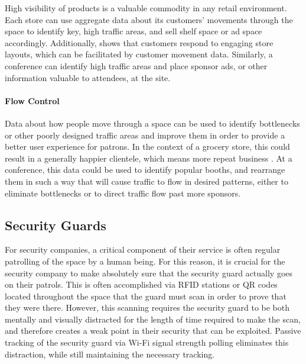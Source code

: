 High visibility of products is a valuable commodity in any retail environment. Each store can use aggregate data about its customers' movements through the space to identify key, high traffic areas, and sell shelf space or ad space accordingly. Additionally, \cite{shukla2013effects} shows that customers respond to engaging store layouts, which can be facilitated by customer movement data. Similarly, a conference can identify high traffic areas and place sponsor ads, or other information valuable to attendees, at the site.

\paragraph{Flow Control}

Data about how people move through a space can be used to identify bottlenecks or other poorly designed traffic areas and improve them in order to provide a better user experience for patrons. In the context of a grocery store, this could result in a generally happier clientele, which means more repeat business \cite{shukla2013effects}. At a conference, this data could be used to identify popular booths, and rearrange them in such a way that will cause traffic to flow in desired patterns, either to eliminate bottlenecks or to direct traffic flow past more sponsors.

\subsection{Security Guards}

For security companies, a critical component of their service is often regular patrolling of the space by a human being. For this reason, it is crucial for the security company to make absolutely sure that the security guard actually goes on their patrols. This is often accomplished via RFID stations or QR codes located throughout the space that the guard must scan in order to prove that they were there. However, this scanning requires the security guard to be both mentally and visually distracted for the length of time required to make the scan, and therefore creates a weak point in their security that can be exploited. Passive tracking of the security guard via Wi-Fi signal strength polling eliminates this distraction, while still maintaining the necessary tracking. 

